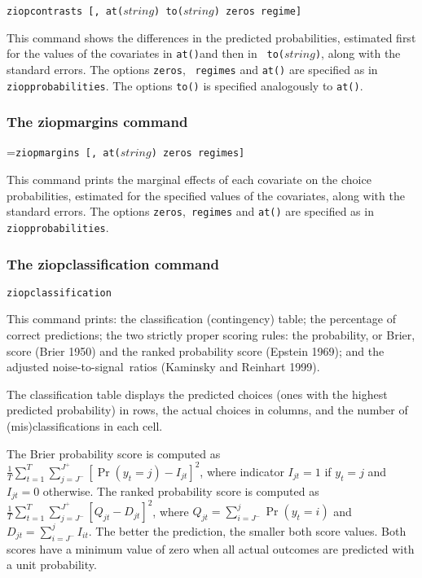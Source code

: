 \documentclass[letterpaper,fleqn,12pt]{article}
\begin{document}
\texttt{ziopcontrasts [, at($string$) to($string$) zeros regime] }

\smallskip 

This command shows the differences in the predicted probabilities, estimated
first for the values of the covariates in \texttt{at()}and then in \texttt{%
to($string$)}, along with the standard errors. The options \texttt{zeros},%
\texttt{\ regimes} and \texttt{at()} are specified as in \texttt{%
ziopprobabilities}. The options \texttt{to()} is specified analogously to 
\texttt{at()}.

\subsubsection*{The ziopmargins command}

\hangindent=\parindent\noindent \texttt{ziopmargins [, at($string$) zeros
regimes]}

\smallskip 

This command prints the marginal effects of each covariate on the choice
probabilities, estimated for the specified values of the covariates, along
with the standard errors. The options \texttt{zeros},\texttt{\ regimes} and 
\texttt{at()} are specified as in \texttt{ziopprobabilities}.

\subsubsection*{The ziopclassification command}

\texttt{ziopclassification}

\smallskip 

This command prints: the classification (contingency) table; the percentage
of correct predictions; the two strictly proper scoring rules: the
probability, or Brier, score (Brier 1950) and the ranked probability score
(Epstein 1969); and the adjusted noise-to-signal\ ratios (Kaminsky and
Reinhart 1999).

The classification table displays the predicted choices (ones with the
highest predicted probability) in rows, the actual choices in columns, and
the number of (mis)classifications in each cell.

The Brier probability score is computed as $\frac{1}{T}\sum_{t=1}^{T}%
\sum_{j=J^{-}}^{J^{+}}[\Pr (y_{t}=j)-I_{jt}]^{2}$, where indicator $I_{jt}=1$
if $y_{t}=j$ and $I_{jt}=0$ otherwise. The ranked probability score is
computed as $\frac{1}{T}\sum_{t=1}^{T}%
\sum_{j=J^{-}}^{J^{+}}[Q_{jt}-D_{jt}]^{2}$, where $Q_{jt}=\sum_{i=J^{-}}^{j}%
\Pr (y_{t}=i)$ and $D_{jt}=\sum_{i=J^{-}}^{j}I_{it}$. The better the
prediction, the smaller both score values. Both scores have a minimum value
of zero when all actual outcomes are predicted with a unit probability.
\end{document}

